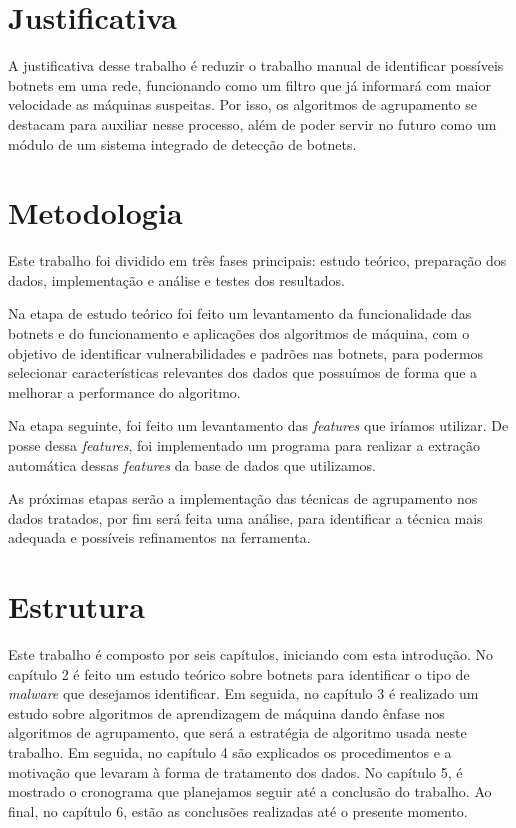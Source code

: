 \section{Justificativa}
A justificativa desse trabalho é reduzir o trabalho manual de identificar possíveis botnets em uma rede, funcionando como um filtro que já informará com maior velocidade as máquinas suspeitas. Por isso, os algoritmos de agrupamento se destacam para auxiliar nesse processo, além de poder servir no futuro como um módulo de um sistema integrado de detecção de botnets\cite{silva2012arquitetura}.

\section{Metodologia}
Este trabalho foi dividido em três fases principais: estudo teórico, preparação dos dados, implementação e análise e testes dos resultados. 

Na etapa de estudo teórico foi feito um levantamento da funcionalidade das botnets e do funcionamento e aplicações dos algoritmos de máquina, com o objetivo de identificar vulnerabilidades e padrões nas botnets, para podermos selecionar características relevantes dos dados que possuímos de forma que a melhorar a performance do algoritmo.

Na etapa seguinte, foi feito um levantamento das \textit{features} que iríamos utilizar. De posse dessa \textit{features}, foi implementado um programa para realizar a extração automática dessas \textit{features} da base de dados que utilizamos.

As próximas etapas serão a implementação das técnicas de agrupamento nos dados tratados, por fim será feita uma análise, para identificar a técnica mais adequada e possíveis refinamentos na ferramenta.

\section{Estrutura}
Este trabalho é composto por seis capítulos, iniciando com esta introdução. No capítulo 2 é feito um estudo teórico sobre botnets para identificar o tipo de \textit{malware} que desejamos identificar. Em seguida, no capítulo 3 é realizado um estudo sobre algoritmos de aprendizagem de máquina dando ênfase nos algoritmos de agrupamento, que será a estratégia de algoritmo usada neste trabalho. Em seguida, no capítulo 4 são explicados os procedimentos e a motivação que levaram à forma de tratamento dos dados. No capítulo 5, é mostrado o cronograma que planejamos seguir até a conclusão do trabalho. Ao final, no capítulo 6, estão as conclusões realizadas até o presente momento.